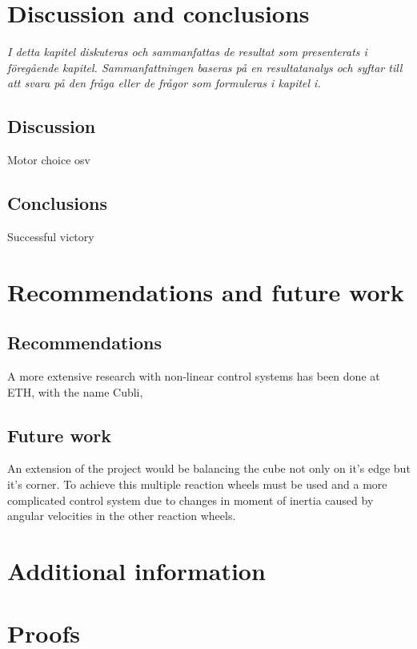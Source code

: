 \documentclass[a4paper,11pt]{kth-mag}
\begin{document}
\chapter{Discussion and conclusions}
\emph{I detta kapitel diskuteras och sammanfattas de resultat som presenterats i föregående kapitel. Sammanfattningen baseras på en resultatanalys och syftar till att svara på den fråga eller de frågor som formuleras i kapitel i.}

\section{Discussion}
Motor choice osv

\section{Conclusions}
Successful victory


\chapter{Recommendations and future work}

\section{Recommendations}
A more extensive research with non-linear control systems has been done at ETH, with the name Cubli,\cite{cubliECC13}

\section{Future work}
An extension of the project would be balancing the cube not only on it's edge but it's corner. To achieve this multiple reaction wheels must be used and a more complicated control system due to changes in moment of inertia caused by angular velocities in the other reaction wheels.

%
\cleardoublepage


\cleardoublepage
\appendix
{}


\chapter{Additional information} \label{appA}

\chapter{Proofs} \label{appB}

\cleardoublepage   
\cleartoverso %
%

\end{document}
